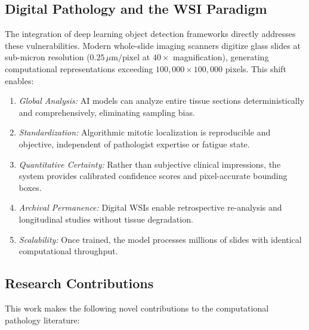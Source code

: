\documentclass[journal]{IEEEtran}
\begin{document}
\subsection{Digital Pathology and the WSI Paradigm}
The integration of deep learning object detection frameworks directly addresses these vulnerabilities. Modern whole-slide imaging scanners digitize glass slides at sub-micron resolution ($0.25\,\mu\text{m/pixel}$ at $40 \times$ magnification), generating computational representations exceeding $100,000 \times 100,000$ pixels. This shift enables:

\begin{enumerate}
\item \textit{Global Analysis:} AI models can analyze entire tissue sections deterministically and comprehensively, eliminating sampling bias.

\item \textit{Standardization:} Algorithmic mitotic localization is reproducible and objective, independent of pathologist expertise or fatigue state.

\item \textit{Quantitative Certainty:} Rather than subjective clinical impressions, the system provides calibrated confidence scores and pixel-accurate bounding boxes.

\item \textit{Archival Permanence:} Digital WSIs enable retrospective re-analysis and longitudinal studies without tissue degradation.

\item \textit{Scalability:} Once trained, the model processes millions of slides with identical computational throughput.
\end{enumerate}

\subsection{Research Contributions}
This work makes the following novel contributions to the computational pathology literature:
\end{document}

